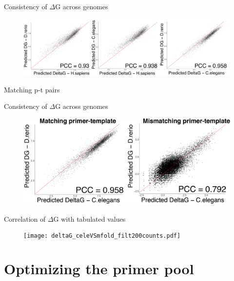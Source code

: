 \documentclass[10pt]{beamer}
\newcommand\Wider[2][3em]{%
\makebox[\linewidth][c]{%
  \begin{minipage}{\dimexpr\textwidth+#1\relax}
  \raggedright#2
  \end{minipage}%
  }%
}
\begin{document}
\begin{frame}{Consistency of $\Delta$G across genomes}
  \begin{figure}
    \includegraphics[scale=0.11]{deltaG_celVShuman_diag.png}
  \end{figure}
  Matching p-t pairs
\end{frame}

\begin{frame}{Consistency of $\Delta$G across genomes}
  \begin{figure}
    \includegraphics[scale=0.15]{deltaG_zfVScele_matchingNmismatching_filt200counts.png}
  \end{figure}
\end{frame}

\begin{frame}{Correlation of $\Delta$G with tabulated values}
  \begin{figure}
    \texttt{[image: deltaG\_celeVSmfold\_filt200counts.pdf]}
  \end{figure}
\end{frame}

\section{Optimizing the primer pool}
\end{document}

